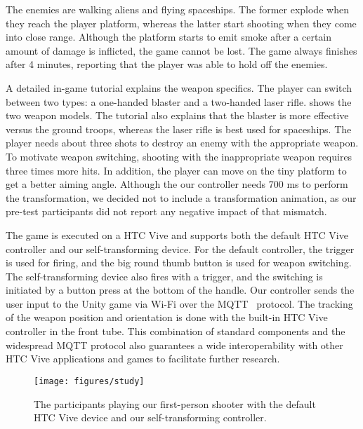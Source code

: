 \documentclass{sigchi}
\begin{document}
The enemies are walking aliens and flying spaceships. The former explode when they reach the player platform, whereas the latter start shooting when they come into close range. Although the platform starts to emit smoke after a certain amount of damage is inflicted, the game cannot be lost. The game always finishes after 4 minutes, reporting that the player was able to hold off the enemies.

A detailed in-game tutorial explains the weapon specifics. The player can switch between two types: a one-handed blaster and a two-handed laser rifle.  shows the two weapon models. The tutorial also explains that the blaster is more effective versus the ground troops, whereas the laser rifle is best used for spaceships. The player needs about three shots to destroy an enemy with the appropriate weapon. To motivate weapon switching, shooting with the inappropriate weapon requires three times more hits. In addition, the player can move on the tiny platform to get a better aiming angle. Although the our controller needs 700 ms to perform the transformation, we decided not to include a transformation animation, as our pre-test participants did not report any negative impact of that mismatch.

The game is executed on a HTC Vive and supports both the default HTC Vive controller and our self-transforming device. For the default controller, the trigger is used for firing, and the big round thumb button is used for weapon switching. The self-transforming device also fires with a trigger, and the switching is initiated by a button press at the bottom of the handle. Our controller sends the user input to the Unity game via Wi-Fi over the MQTT~\cite{mqtt} protocol. The tracking of the weapon position and orientation is done with the built-in HTC Vive controller in the front tube. This combination of standard components and the widespread MQTT protocol also guarantees a wide interoperability with other HTC Vive applications and games to facilitate further research.



\begin{figure*}[t!]
\centering
\texttt{[image: figures/study]}
\caption{The participants playing our first-person shooter with the default HTC Vive device and our self-transforming controller.}
\label{fig:setup}
\end{figure*}
\end{document}
